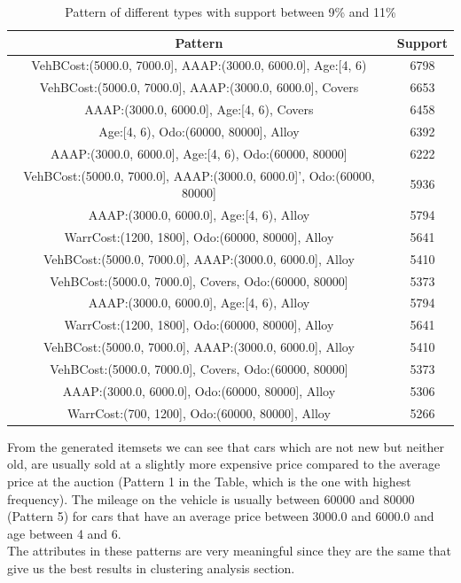 \documentclass{article}
\begin{document}
	\begin{table}[H]
		\centering
		\begin{tabular}{|c|c|}
			\hline
			\textbf{Pattern} & \textbf{Support} \\
			\hline
			\rowcolor{Gray}
			VehBCost:(5000.0, 7000.0], AAAP:(3000.0, 6000.0], Age:[4, 6) &  6798\\
			VehBCost:(5000.0, 7000.0], AAAP:(3000.0, 6000.0], Covers &  6653\\
			\rowcolor{Gray}
			AAAP:(3000.0, 6000.0], Age:[4, 6), Covers &  6458\\
			Age:[4, 6), Odo:(60000, 80000], Alloy &  6392\\
			\rowcolor{Gray}
			AAAP:(3000.0, 6000.0], Age:[4, 6), Odo:(60000, 80000] &  6222\\
			VehBCost:(5000.0, 7000.0], AAAP:(3000.0, 6000.0]', Odo:(60000, 80000]  & 5936\\
			\rowcolor{Gray}
			AAAP:(3000.0, 6000.0], Age:[4, 6), Alloy &  5794\\
			WarrCost:(1200, 1800], Odo:(60000, 80000], Alloy & 5641\\
			\rowcolor{Gray}
			VehBCost:(5000.0, 7000.0], AAAP:(3000.0, 6000.0], Alloy &  5410\\
			VehBCost:(5000.0, 7000.0], Covers, Odo:(60000, 80000] & 5373\\
			\rowcolor{Gray}
			AAAP:(3000.0, 6000.0], Age:[4, 6), Alloy & 5794\\
			WarrCost:(1200, 1800], Odo:(60000, 80000], Alloy & 5641\\
			\rowcolor{Gray}
			VehBCost:(5000.0, 7000.0], AAAP:(3000.0, 6000.0], Alloy & 5410\\
			VehBCost:(5000.0, 7000.0], Covers, Odo:(60000, 80000] & 5373\\
			\rowcolor{Gray}
			AAAP:(3000.0, 6000.0], Odo:(60000, 80000], Alloy & 5306\\
			WarrCost:(700, 1200], Odo:(60000, 80000], Alloy & 5266\\\hline
		\end{tabular}
		\caption{Pattern of different types with support between 9\% and 11\%}
		\label{tab:boh}
	\end{table}
	
	From the generated itemsets we can see that cars which are not new but neither old, are usually sold at a slightly more expensive price compared to the average price at the auction (Pattern 1 in the Table, which is the one with highest frequency). The mileage on the vehicle is usually between 60000 and 80000 (Pattern 5) for cars that have an average price between 3000.0 and 6000.0 and age between 4 and 6.\\ %
	The attributes in these patterns are very meaningful since they are the same that give us the best results in clustering analysis section. 
	
\end{document}
